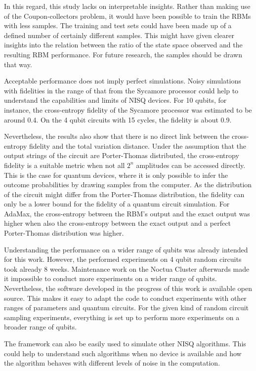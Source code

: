 In this regard, this study lacks on interpretable insights. Rather than making use of the 
Coupon-collectors problem, it would have been possible to train the RBMs with less samples. 
The training and test sets could have been made up of a defined number of certainly different 
samples. This might have given clearer insights into the relation between the ratio of the 
state space observed and the resulting RBM performance. For future research, the samples should
be drawn that way.

Acceptable performance does not imply perfect simulations. Noisy simulations with 
fidelities in the range of that from the Sycamore processor could help to understand the 
capabilities and limits of NISQ devices. For 10 qubits, for instance, the cross-entropy fidelity
of the Sycamore processor was estimated to be around 0.4. On the 4 qubit circuits with 
15 cycles, the fidelity is about 0.9.

Nevertheless, the results also show that there is no direct link between the cross-entropy
fidelity and the total variation distance. Under the assumption that the output strings of 
the circuit are Porter-Thomas distributed, the cross-entropy fidelity is a suitable metric
when not all $2^n$ amplitudes can be accessed directly. This is the case for quantum devices, 
where it is only possible to infer the outcome probabilities by drawing samples from the computer.
As the distribution of the circuit might differ from the Porter-Thomas distribution, 
the fidelity can only be a lower bound for the fidelity of a quantum circuit simulation.
For AdaMax, the cross-entropy between the RBM's output and the exact output was 
higher when also the cross-entropy between the exact output and a perfect Porter-Thomas 
distribution was higher.

Understanding the performance on a wider range of qubits was already intended for this work. 
However, the performed experiments 
on 4 qubit random circuits took already 8 weeks. Maintenance work on the Noctua Cluster 
afterwards made it impossible to conduct more experiments on a wider range of qubits.
Nevertheless, the software developed in the progress of this work is available open source. 
This makes it easy to adapt the code to conduct experiments 
with other ranges of parameters and quantum circuits. For the given kind of random circuit 
sampling experiments, everything is set up to perform more experiments on a broader range of 
qubits.

The framework can also be easily used to simulate other NISQ algorithms. This could help to 
understand such algorithms when no device is available and how the algorithm
behaves with different levels of noise in the computation.

